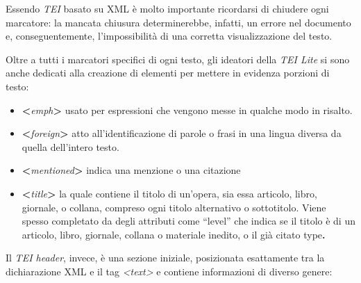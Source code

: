 \documentclass[
  b5paper,
  twoside,
  12pt,
  chapterprefix=false,
  bibliography=totocnumbered,
  parskip=false]{scrbook}
\begin{document}
Essendo \emph{TEI} basato su XML è molto importante ricordarsi di chiudere
ogni marcatore: la mancata chiusura determinerebbe, infatti, un errore
nel documento e, conseguentemente, l'impossibilità di una corretta
visualizzazione del testo.

Oltre a tutti i marcatori specifici di ogni testo, gli ideatori della
\emph{TEI Lite} si sono anche dedicati alla creazione di elementi per mettere
in evidenza porzioni di testo:

\begin{itemize}
\item
  \textbf{\textless{}}\emph{emph}\textbf{\textgreater{}} usato per espressioni che vengono messe in
  qualche modo in risalto.
\item
  \textbf{\textless{}}\emph{foreign}\textbf{\textgreater{}} atto all'identificazione di parole o frasi in
  una lingua diversa da quella dell'intero testo.
\item
  \textbf{\textless{}}\emph{mentioned}\textbf{\textgreater{}} indica una menzione o una citazione
\item
  \textbf{\textless{}}\emph{title}\textbf{\textgreater{}} la quale contiene il titolo di un'opera, sia
  essa articolo, libro, giornale, o collana, compreso ogni titolo
  alternativo o sottotitolo. Viene spesso completato da degli
  attributi come \enquote{level} che indica se il titolo è di un articolo,
  libro, giornale, collana o materiale inedito, o il già citato
  type\textbf{.}
\end{itemize}

Il \emph{TEI header}, invece, è una sezione iniziale, posizionata esattamente
tra la dichiarazione XML e il tag \emph{\textless text\textgreater{}} e contiene informazioni di
diverso genere:
\end{document}

